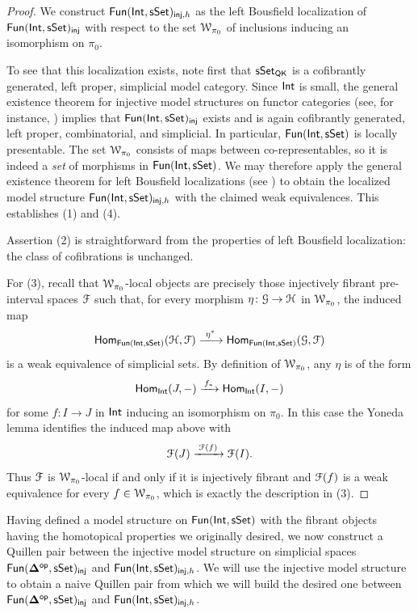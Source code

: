 \begin{proof}
We construct $\operatorname{\sf Fun}(\operatorname{\mathsf{Int}},\operatorname{\sf sSet})_{\mathsf{inj},h}$ as the left Bousfield
localization of $\operatorname{\sf Fun}(\operatorname{\mathsf{Int}},\operatorname{\sf sSet})_{\mathsf{inj}}$ with respect to the set
$\mathcal W_{\pi_0}$ of inclusions inducing an isomorphism on $\pi_0$.

To see that this localization exists, note first that
$\operatorname{\sf sSet}_{\mathsf{QK}}$ is a cofibrantly generated, left proper, simplicial
model category. Since $\operatorname{\mathsf{Int}}$ is small, the general existence theorem for
injective model structures on functor categories (see, for instance,
) implies that
$\operatorname{\sf Fun}(\operatorname{\mathsf{Int}},\operatorname{\sf sSet})_{\mathsf{inj}}$ exists and is again cofibrantly generated,
left proper, combinatorial, and simplicial. In particular, $\operatorname{\sf Fun}(\operatorname{\mathsf{Int}},\operatorname{\sf sSet})$
is locally presentable. The set $\mathcal W_{\pi_0}$ consists of maps between
co-representables, so it is indeed a \emph{set} of morphisms in
$\operatorname{\sf Fun}(\operatorname{\mathsf{Int}},\operatorname{\sf sSet})$. We may therefore apply the general existence theorem for
left Bousfield localizations (see )
to obtain the localized model structure
$\operatorname{\sf Fun}(\operatorname{\mathsf{Int}},\operatorname{\sf sSet})_{\mathsf{inj},h}$ with the claimed weak equivalences. This
establishes (1) and (4).

Assertion (2) is straightforward from the properties of left Bousfield
localization: the class of cofibrations is unchanged.

For (3), recall that $\mathcal W_{\pi_0}$-local objects are precisely those
injectively fibrant pre-interval spaces $\mathcal F$ such that, for every morphism
$\eta\colon \mathcal G\to\mathcal H$ in $\mathcal W_{\pi_0}$, the induced map
\[
  \Hom_{\fun(\Int,\sset)}(\cH,\cF)
  \xlongrightarrow{\ \eta^*\ }
  \Hom_{\fun(\Int,\sset)}(\cG,\cF)
\]
is a weak equivalence of simplicial sets. By definition of $\mathcal W_{\pi_0}$, any
$\eta$ is of the form
\[
  \operatorname{\sf Hom}_{\operatorname{\mathsf{Int}}}(J,-)\xrightarrow{\,f_*\,}\operatorname{\sf Hom}_{\operatorname{\mathsf{Int}}}(I,-)
\]
for some $f\colon I\to J$ in $\operatorname{\mathsf{Int}}$ inducing an isomorphism on $\pi_0$. In
this case the Yoneda lemma identifies the induced map above with
\[
  \mathcal F(J)\xrightarrow{\;\mathcal F(f)\;}\mathcal F(I).
\]
Thus $\mathcal F$ is $\mathcal W_{\pi_0}$-local if and only if it is injectively fibrant and
$\mathcal F(f)$ is a weak equivalence for every $f\in\mathcal W_{\pi_0}$, which is exactly
the description in (3).
\end{proof}

Having defined a model structure on $\operatorname{\sf Fun}(\operatorname{\mathsf{Int}}, \operatorname{\sf sSet})$ with the fibrant objects having the homotopical properties we originally desired, we now construct a Quillen pair between the injective model structure on simplicial spaces $\operatorname{\sf Fun}(\mathbf\Delta^{\mathsf{op}},\operatorname{\sf sSet})_{\sf inj}$ and $\operatorname{\sf Fun}(\operatorname{\mathsf{Int}}, \operatorname{\sf sSet})_{\mathsf{inj},h}$. We will use the injective model structure to obtain a naive Quillen pair from which we will build the desired one between $\operatorname{\sf Fun}(\mathbf\Delta^{\mathsf{op}},\operatorname{\sf sSet})_{\mathsf{inj}}$ and $\operatorname{\sf Fun}(\operatorname{\mathsf{Int}},\operatorname{\sf sSet})_{\mathsf{inj},h}$.

